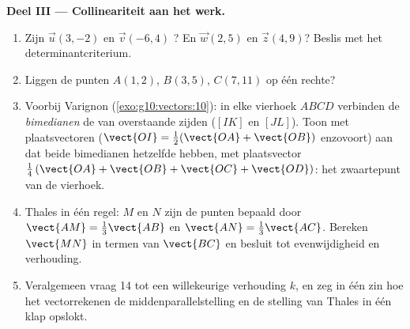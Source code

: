 \begin{problem}
\medskip
\noindent\textbf{Deel III --- Collineariteit aan het werk.}
\begin{enumerate}[resume]
  \item Zijn $\vec u(3, -2)$ en $\vec v(-6, 4)$ ? En $\vec w(2, 5)$
        en $\vec z(4, 9)$? Beslis met het determinantcriterium.
  \item Liggen de punten $A(1, 2)$, $B(3, 5)$, $C(7, 11)$ op één rechte?
  \item Voorbij Varignon (\cref{exo:g10:vectors:10}): in elke vierhoek
        $ABCD$ verbinden de \emph{bimedianen} de  van overstaande
        zijden ($[IK]$ en $[JL]$). Toon met plaatsvectoren
        ($\vect{OI} = \frac12(\vect{OA} + \vect{OB})$ enzovoort) aan dat
        beide bimedianen hetzelfde  hebben, met plaatsvector
        $\frac14\left(\vect{OA} + \vect{OB} + \vect{OC} +
        \vect{OD}\right)$: het zwaartepunt van de vierhoek.
  \item Thales in één regel: $M$ en $N$ zijn de punten bepaald door
        $\vect{AM} = \frac13\vect{AB}$ en $\vect{AN} = \frac13\vect{AC}$.
        Bereken $\vect{MN}$ in termen van $\vect{BC}$ en besluit tot
        evenwijdigheid en verhouding.
  \item Veralgemeen vraag 14 tot een willekeurige verhouding $k$, en zeg in
        één zin hoe het vectorrekenen de middenparallelstelling en de stelling
        van Thales in één klap opslokt.
\end{enumerate}


\end{problem}
